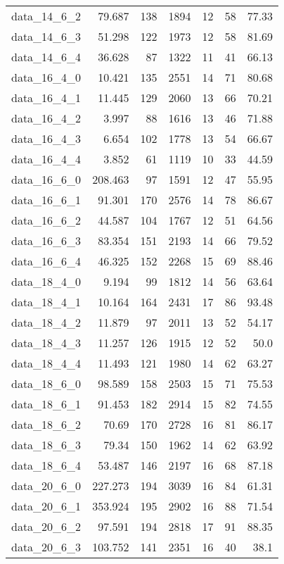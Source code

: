 \begin{tabular}{rrrrrrr}
  data\_14\_6\_2 & 79.687 & 138 & 1894 & 12 & 58 & 77.33 \\
  data\_14\_6\_3 & 51.298 & 122 & 1973 & 12 & 58 & 81.69 \\
  data\_14\_6\_4 & 36.628 & 87 & 1322 & 11 & 41 & 66.13 \\
  data\_16\_4\_0 & 10.421 & 135 & 2551 & 14 & 71 & 80.68 \\
  data\_16\_4\_1 & 11.445 & 129 & 2060 & 13 & 66 & 70.21 \\
  data\_16\_4\_2 & 3.997 & 88 & 1616 & 13 & 46 & 71.88 \\
  data\_16\_4\_3 & 6.654 & 102 & 1778 & 13 & 54 & 66.67 \\
  data\_16\_4\_4 & 3.852 & 61 & 1119 & 10 & 33 & 44.59 \\
  data\_16\_6\_0 & 208.463 & 97 & 1591 & 12 & 47 & 55.95 \\
  data\_16\_6\_1 & 91.301 & 170 & 2576 & 14 & 78 & 86.67 \\
  data\_16\_6\_2 & 44.587 & 104 & 1767 & 12 & 51 & 64.56 \\
  data\_16\_6\_3 & 83.354 & 151 & 2193 & 14 & 66 & 79.52 \\
  data\_16\_6\_4 & 46.325 & 152 & 2268 & 15 & 69 & 88.46 \\
  data\_18\_4\_0 & 9.194 & 99 & 1812 & 14 & 56 & 63.64 \\
  data\_18\_4\_1 & 10.164 & 164 & 2431 & 17 & 86 & 93.48 \\
  data\_18\_4\_2 & 11.879 & 97 & 2011 & 13 & 52 & 54.17 \\
  data\_18\_4\_3 & 11.257 & 126 & 1915 & 12 & 52 & 50.0 \\
  data\_18\_4\_4 & 11.493 & 121 & 1980 & 14 & 62 & 63.27 \\
  data\_18\_6\_0 & 98.589 & 158 & 2503 & 15 & 71 & 75.53 \\
  data\_18\_6\_1 & 91.453 & 182 & 2914 & 15 & 82 & 74.55 \\
  data\_18\_6\_2 & 70.69 & 170 & 2728 & 16 & 81 & 86.17 \\
  data\_18\_6\_3 & 79.34 & 150 & 1962 & 14 & 62 & 63.92 \\
  data\_18\_6\_4 & 53.487 & 146 & 2197 & 16 & 68 & 87.18 \\
  data\_20\_6\_0 & 227.273 & 194 & 3039 & 16 & 84 & 61.31 \\
  data\_20\_6\_1 & 353.924 & 195 & 2902 & 16 & 88 & 71.54 \\
  data\_20\_6\_2 & 97.591 & 194 & 2818 & 17 & 91 & 88.35 \\
  data\_20\_6\_3 & 103.752 & 141 & 2351 & 16 & 40 & 38.1 \\

\end{tabular}
